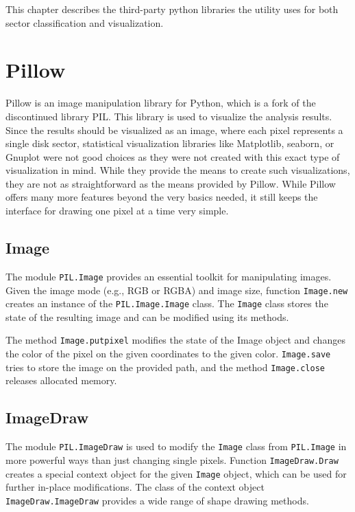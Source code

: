 \documentclass[
  digital, %
  color,   %
  oneside, %
  lof,     %
  nolot,     %
]{fithesis4}
\begin{document}
This chapter describes the third-party python libraries the utility uses for both sector classification and visualization.

\section{Pillow}
\label{sec:pillow}

Pillow\cite{pillow} is an image manipulation library for Python, which is a fork of the discontinued library PIL\cite{pil}.
This library is used to visualize the analysis results.
Since the results should be visualized as an image, where each pixel represents a single disk sector, statistical visualization libraries like Matplotlib\cite{matplotlib}, seaborn\cite{waskom21}, or Gnuplot\cite{gnuplot} were not good choices as they were not created with this exact type of visualization in mind.
While they provide the means to create such visualizations, they are not as straightforward as the means provided by Pillow.
While Pillow offers many more features beyond the very basics needed, it still keeps the interface for drawing one pixel at a time very simple. 

\subsection{Image}
\label{ssec:image}

The module \texttt{PIL.Image} provides an essential toolkit for manipulating images.
Given the image mode (e.g., RGB or RGBA) and image size, function \texttt{Image.new} creates an instance of the \texttt{PIL.Image.Image} class.
The \texttt{Image} class stores the state of the resulting image and can be modified using its methods. 

The method \texttt{Image.putpixel} modifies the state of the Image object and changes the color of the pixel on the given coordinates to the given color.
\texttt{Image.save} tries to store the image on the provided path, and the method \texttt{Image.close} releases allocated memory. \cite{pillowimage}

\subsection{ImageDraw}
\label{ssec:imagedraw}

The module \texttt{PIL.ImageDraw} is used to modify the \texttt{Image} class from \texttt{PIL.Image} in more powerful ways than just changing single pixels.
Function \texttt{ImageDraw.Draw} creates a special context object for the given \texttt{Image} object, which can be used for further in-place modifications.
The class of the context object \texttt{ImageDraw.ImageDraw} provides a wide range of shape drawing methods.
\end{document}
